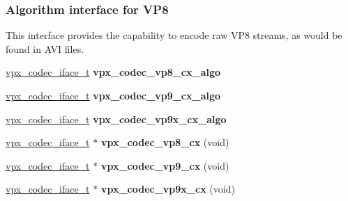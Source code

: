 \subsubsection*{\-Algorithm interface for \-V\-P8}
\label{_amgrp0b829b38ff2e659173b35cd78e0735bd}%
 \-This interface provides the capability to encode raw \-V\-P8 streams, as would be found in \-A\-V\-I files. \begin{DoxyCompactItemize}
\item 
\hypertarget{group__vp8__encoder_ga689ede372ab835c8e1c9631f17b47eb5}{\hyperlink{group__codec_gad654f3da60151f5dfef70aca00ef1e9e}{vpx\-\_\-codec\-\_\-iface\-\_\-t} {\bfseries vpx\-\_\-codec\-\_\-vp8\-\_\-cx\-\_\-algo}}\label{group__vp8__encoder_ga689ede372ab835c8e1c9631f17b47eb5}

\item 
\hypertarget{group__vp8__encoder_ga2d01224b7a5b2a1ecf538493b3089d0f}{\hyperlink{group__codec_gad654f3da60151f5dfef70aca00ef1e9e}{vpx\-\_\-codec\-\_\-iface\-\_\-t} {\bfseries vpx\-\_\-codec\-\_\-vp9\-\_\-cx\-\_\-algo}}\label{group__vp8__encoder_ga2d01224b7a5b2a1ecf538493b3089d0f}

\item 
\hypertarget{group__vp8__encoder_gaa9e851e4d1535df1ab7451122ae90688}{\hyperlink{group__codec_gad654f3da60151f5dfef70aca00ef1e9e}{vpx\-\_\-codec\-\_\-iface\-\_\-t} {\bfseries vpx\-\_\-codec\-\_\-vp9x\-\_\-cx\-\_\-algo}}\label{group__vp8__encoder_gaa9e851e4d1535df1ab7451122ae90688}

\item 
\hypertarget{group__vp8__encoder_ga1b5362d0d5b5a2d50f173f9c160fad9f}{\hyperlink{group__codec_gad654f3da60151f5dfef70aca00ef1e9e}{vpx\-\_\-codec\-\_\-iface\-\_\-t} $\ast$ {\bfseries vpx\-\_\-codec\-\_\-vp8\-\_\-cx} (void)}\label{group__vp8__encoder_ga1b5362d0d5b5a2d50f173f9c160fad9f}

\item 
\hypertarget{group__vp8__encoder_ga3fdeb42af524ef0f07695aab8d95ae2c}{\hyperlink{group__codec_gad654f3da60151f5dfef70aca00ef1e9e}{vpx\-\_\-codec\-\_\-iface\-\_\-t} $\ast$ {\bfseries vpx\-\_\-codec\-\_\-vp9\-\_\-cx} (void)}\label{group__vp8__encoder_ga3fdeb42af524ef0f07695aab8d95ae2c}

\item 
\hypertarget{group__vp8__encoder_ga68279a080de517a6eb28e97b2602d632}{\hyperlink{group__codec_gad654f3da60151f5dfef70aca00ef1e9e}{vpx\-\_\-codec\-\_\-iface\-\_\-t} $\ast$ {\bfseries vpx\-\_\-codec\-\_\-vp9x\-\_\-cx} (void)}\label{group__vp8__encoder_ga68279a080de517a6eb28e97b2602d632}

\end{DoxyCompactItemize}


